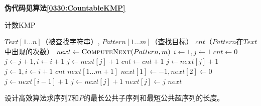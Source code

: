 \begin{questions}
\begin{solution}
        \textbf{伪代码见算法\ref{0330:CountableKMP}}
    \end{solution}

    \begin{algorithm}[!ht]
        \caption{计数KMP}\label{0330:CountableKMP}
        \begin{algorithmic}[1]
            \Require $Text[1 \dots n]$（被查找字符串）, $Pattern[1 \dots m]$（查找目标）
            \Ensure $cnt$（$Pattern$在$Text$中出现的次数）
            \State $next \gets \Call{ComputeNext}{Pattern, m}$
            \State $i \gets 1, j \gets 1$
            \State $ cnt \gets 0$
            \State $j \gets j+1,i \gets i+1$
            \State $j \gets next[j] + 1$
            \State $cnt \gets cnt + 1$
            \EndIf
            \Else
            \State $j \gets next[j]+1$
            \State $j \gets 1, i \gets i+1$
            \EndIf
            \EndIf
            \EndWhile
            \State \Return $cnt$
            \EndProcedure
            \Statex
            \State $next[1 \dots m+1]$
            \State $next[1] \gets -1, next[2] \gets 0$
            \State $j \gets next[i-1] + 1$
            \State $j \gets next[j] + 1$
            \EndWhile
            \State $next[j] \gets j$
            \EndFor
            \State \Return $next$
            \EndProcedure
        \end{algorithmic}
    \end{algorithm}

    \question 设计高效算法求序列$T$和$P$的最长公共子序列和最短公共超序列的长度。
\end{questions}
